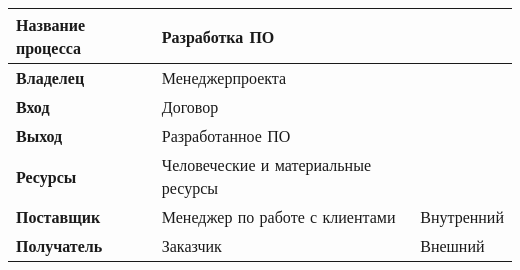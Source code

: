 \documentclass[a4paper,14pt]{extarticle}
\begin{document}
\if
\newpage

\begin{table}[htbp]
	\begin{center}
		\begin{tabular}{|l|l|l|}
			\hline
			\textbf{Название процесса} & Разработка ПО &  \\ \hline
			\textbf{Владелец} & Менеджерпроекта &  \\ \hline
			\textbf{Вход} & Договор &  \\ \hline
			\textbf{Выход} & Разработанное ПО &  \\ \hline
			\textbf{Ресурсы} & Человеческие и материальные ресурсы &  \\ \hline
			\textbf{Поставщик} & Менеджер по работе с клиентами & Внутренний \\ \hline
			\textbf{Получатель} & Заказчик & Внешний \\ \hline
		\end{tabular}
	\end{center}
	\label{}
\end{table}
\fi

\end{document}
